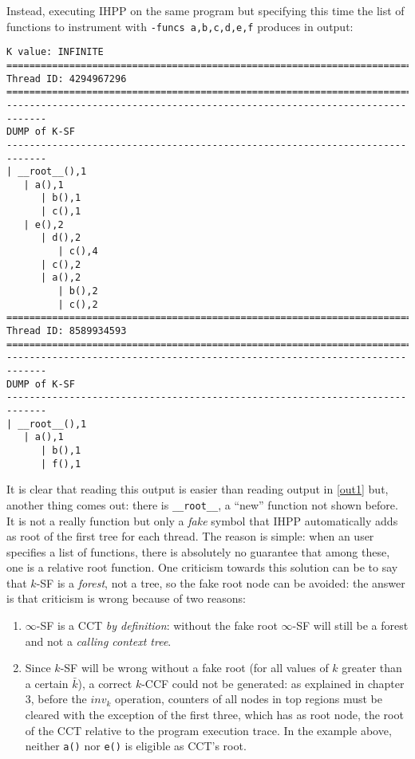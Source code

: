 \documentclass[a4paper,10pt]{report}
\begin{document}
\renewcommand{\labelitemi}{$\bullet$}
\noindent
Instead, executing IHPP on the same program but specifying this time the list
of functions to instrument with \verb|-funcs a,b,c,d,e,f| produces in output:

\begin{lstlisting}[label=out2,
caption={The output of IHPP run with selective tracing}, frame=bottomline]
K value: INFINITE
=============================================================================
Thread ID: 4294967296
=============================================================================
-----------------------------------------------------------------------------
DUMP of K-SF
-----------------------------------------------------------------------------
| __root__(),1
   | a(),1
      | b(),1
      | c(),1
   | e(),2
      | d(),2
         | c(),4
      | c(),2
      | a(),2
         | b(),2
         | c(),2
=============================================================================
Thread ID: 8589934593
=============================================================================
-----------------------------------------------------------------------------
DUMP of K-SF
-----------------------------------------------------------------------------
| __root__(),1
   | a(),1
      | b(),1
      | f(),1
\end{lstlisting}
\noindent
It is clear that reading this output is easier than reading output in \cref{out1} but,
another thing comes out: there is \verb|__root__|, a ``new'' function not shown before.
It is not a really function but only a \emph{fake} symbol that IHPP automatically adds
as root of the first tree for each thread. The reason is simple: when an user specifies
a list of functions, there is absolutely no guarantee that among these, one is a relative root function.
One criticism towards this solution can be to say that $k$-SF is a \emph{forest}, not a tree, so the fake root node can be avoided: the answer is that criticism is wrong because of two reasons:
\begin{enumerate}
\item $\infty$-SF is a CCT \emph{by definition}: without the fake root $\infty$-SF will still be a forest and not a \emph{calling context tree}.
\item Since $k$-SF will be wrong without a fake root (for all values of $k$ greater than a certain $\bar{k}$), a correct $k$-CCF could not be generated: as explained in chapter 3, before the $inv_k$ operation, counters of all nodes
in top regions must be cleared with the exception of the first three, which has as root node, the root of the CCT relative to the program execution trace. In the example above,
neither \verb|a()| nor \verb|e()| is eligible as CCT's root.
\end{enumerate}
\end{document}
